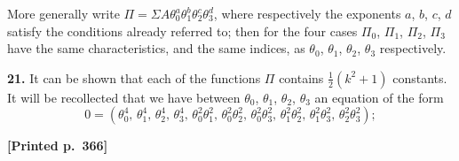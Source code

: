 \documentclass[11pt]{article}
\begin{document}
More generally write $\Pi=\Sigma A\theta_{0}^{a}\theta_{1}^{b}\theta_{2}^{c}\theta_{3}^{d}$, where respectively the exponents $a$, $b$, $c$, $d$ satisfy the conditions already referred to; then for the four cases $\Pi_{0}$, $\Pi_{1}$, $\Pi_{2}$, $\Pi_{3}$ have the same characteristics, and the same indices, as $\theta_{0}$, $\theta_{1}$, $\theta_{2}$, $\theta_{3}$ respectively.

\medskip
\noindent\textbf{21.} It can be shown that each of the functions $\Pi$ contains $\tfrac{1}{2}(k^{2}+1)$ constants. It will be recollected that we have between $\theta_{0}$, $\theta_{1}$, $\theta_{2}$, $\theta_{3}$ an equation of the form
\[
0=(\theta_{0}^{4},\,\theta_{1}^{4},\,\theta_{2}^{4},\,\theta_{3}^{4},\,\theta_{0}^{2}\theta_{1}^{2},\,\theta_{0}^{2}\theta_{2}^{2},\,\theta_{0}^{2}\theta_{3}^{2},\,\theta_{1}^{2}\theta_{2}^{2},\,\theta_{1}^{2}\theta_{3}^{2},\,\theta_{2}^{2}\theta_{3}^{2});
\]

\medskip
\noindent\textbf{[Printed p.~366]}\hfill
\end{document}
